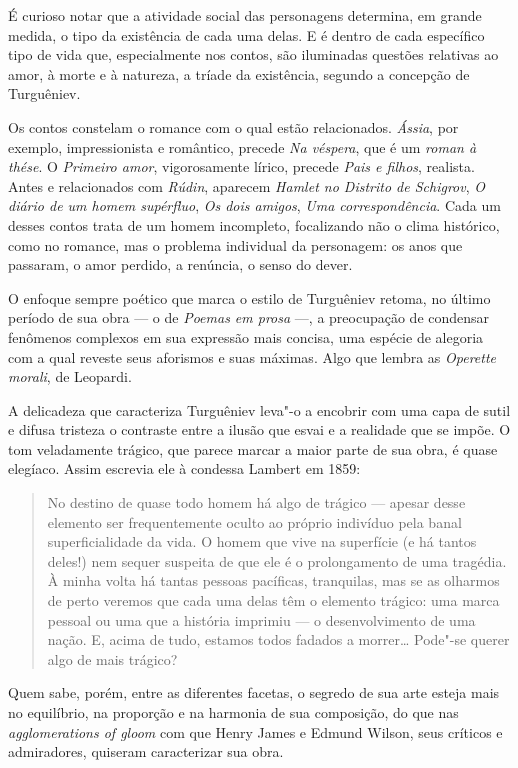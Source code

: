 É curioso notar que a atividade social das personagens determina, em grande
medida, o tipo da existência de cada uma delas. E é dentro de cada
específico tipo de vida que, especialmente nos contos, são iluminadas
questões relativas ao amor, à morte e à natureza, a tríade da
existência, segundo a concepção de Turguêniev.

Os contos constelam o romance com o qual estão relacionados.
\emph{Ássia}, por exemplo, impressionista e romântico, precede \emph{Na
véspera}, que é um \emph{roman à thése}. O \emph{Primeiro amor},
vigorosamente lírico, precede \emph{Pais e filhos}, realista. Antes e relacionados
com \emph{Rúdin}, aparecem \emph{Hamlet no Distrito de Schigrov}, \emph{O
diário de um homem supérfluo}, \emph{Os dois amigos}, \emph{Uma
correspondência}. Cada um desses contos trata de um homem incompleto,
focalizando não o clima histórico, como no romance, mas o problema
individual da personagem: os anos que passaram, o amor perdido, a
renúncia, o senso do dever.

O enfoque sempre poético que marca o estilo de Turguêniev retoma, no
último período de sua obra --- o de \emph{Poemas em prosa} ---, a
preocupação de condensar fenômenos complexos em sua expressão mais
concisa, uma espécie de alegoria com a qual reveste seus aforismos e
suas máximas. Algo que lembra as \emph{Operette morali}, de Leopardi.

A delicadeza que caracteriza Turguêniev leva"-o a encobrir com uma capa
de sutil e difusa tristeza o contraste entre a ilusão que esvai e a
realidade que se impõe. O tom veladamente trágico, que parece marcar a
maior parte de sua obra, é quase elegíaco. Assim escrevia ele à condessa
Lambert em 1859:

\begin{quote}
No destino de quase todo homem há algo de trágico --- apesar desse
elemento ser frequentemente oculto ao próprio indivíduo pela banal
superficialidade da vida. O homem que vive na superfície (e há tantos
deles!) nem sequer suspeita de que ele é o prolongamento de uma
tragédia. À minha volta há tantas pessoas pacíficas, tranquilas, mas se as
olharmos de perto veremos que cada uma delas têm o elemento trágico: uma
marca pessoal ou uma que a história imprimiu --- o desenvolvimento de uma
nação. E, acima de tudo, estamos todos fadados a morrer\ldots{} Pode"-se
querer algo de mais trágico?
\end{quote}

Quem sabe, porém, entre as diferentes facetas, o segredo de sua arte esteja mais no
equilíbrio, na proporção e na harmonia de sua composição, do que nas
\emph{agglomerations of gloom} com que Henry James e Edmund Wilson, seus
críticos e admiradores, quiseram caracterizar sua obra.

